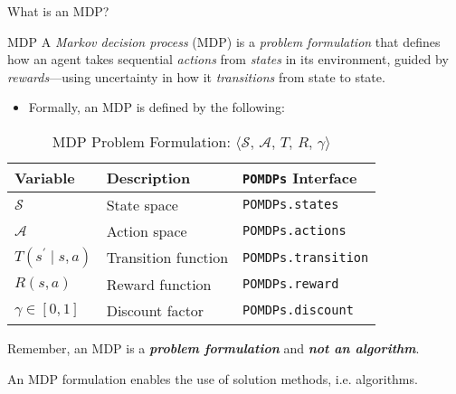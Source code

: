 
\begin{frame}[fragile]{What is an MDP?}

\begin{definitionblock}{MDP}
    A \textit{Markov decision process} (MDP) is a \textit{problem formulation} that defines how an agent takes sequential \textit{actions} from \textit{states} in its environment, guided by \textit{rewards}---using uncertainty in how it \textit{transitions} from state to state.
\end{definitionblock}

\phantom{}

\begin{itemize}
    \item Formally, an MDP is defined by the following:
\end{itemize}
\begin{table}[!t]
    {\scriptsize
    \centering
    \caption{\label{tab:solutions} MDP Problem Formulation: $\langle \mathcal{S},\, \mathcal{A},\, T,\, R,\, \gamma \rangle$}
    \begin{threeparttable}
    \begin{tabular}{lll}
        \toprule
        \textbf{Variable} & \textbf{Description} & \textbf{\texttt{POMDPs} Interface} \\
        \midrule
        $\mathcal{S}$ & State space & \texttt{POMDPs.states} \\
        $\mathcal{A}$ & Action space & \texttt{POMDPs.actions} \\
        $T(s^\prime \mid s,a)$ & Transition function & \texttt{POMDPs.transition} \\
        $R(s,a)$ & Reward function & \texttt{POMDPs.reward} \\
        $\gamma \in [0,1]$ & Discount factor & \texttt{POMDPs.discount} \\
        \bottomrule
    \end{tabular}
    \end{threeparttable}
    }
\end{table}

\begin{importantblock}
    {\footnotesize
    \begin{center}
    Remember, an MDP is a \textit{\textbf{problem formulation}} and \textit{\textbf{not an algorithm}}.
  
    An MDP formulation enables the use of solution methods, i.e. algorithms.
    \end{center}
    }
\end{importantblock}

\end{frame}

